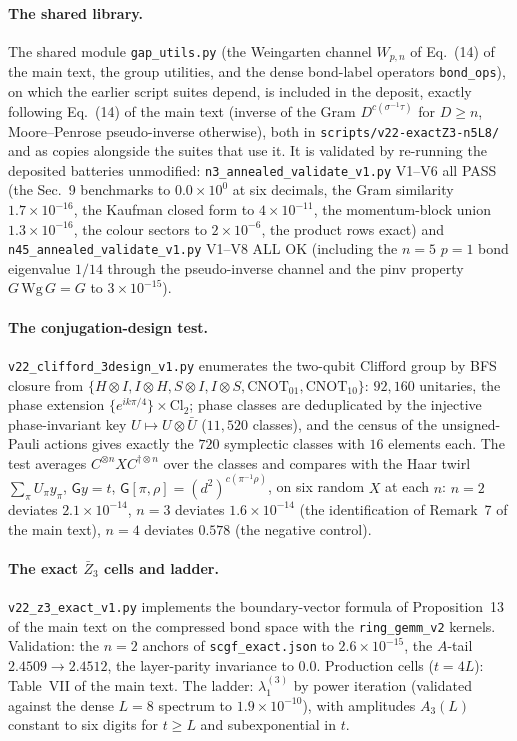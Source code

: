 \documentclass[aps,prx,reprint,superscriptaddress,nobibnotes,longbibliography]{revtex4-2}
\begin{document}
\paragraph{The shared library.}
The shared module \texttt{gap\_utils.py} (the Weingarten channel
$W_{p,n}$ of Eq.~(14) of the main text, the group utilities, and the dense bond-label
operators \texttt{bond\_ops}), on which the earlier script suites depend,
is included in the deposit, exactly following Eq.~(14) of the main text (inverse of the
Gram $D^{c(\sigma^{-1}\tau)}$ for $D\ge n$, Moore--Penrose pseudo-inverse
otherwise), both in \texttt{scripts/v22-exactZ3-n5L8/} and as copies
alongside the suites that use it.  It is validated by re-running the
deposited batteries unmodified: \texttt{n3\_annealed\_validate\_v1.py} V1--V6 all
PASS (the Sec.~9 benchmarks to $0.0\times10^{0}$ at six decimals, the
Gram similarity $1.7\times10^{-16}$, the Kaufman closed form to
$4\times10^{-11}$, the momentum-block union $1.3\times10^{-16}$, the
colour sectors to $2\times10^{-6}$, the product rows exact) and
\texttt{n45\_annealed\_validate\_v1.py} V1--V8 ALL OK (including the
$n=5$ $p=1$ bond eigenvalue $1/14$ through the pseudo-inverse channel and
the pinv property $G\,\mathrm{Wg}\,G=G$ to $3\times10^{-15}$).

\paragraph{The conjugation-design test.}
\texttt{v22\_clifford\_3design\_v1.py} enumerates the two-qubit Clifford
group by BFS closure from $\{H\otimes I, I\otimes H, S\otimes I,
I\otimes S, \mathrm{CNOT}_{01}, \mathrm{CNOT}_{10}\}$: $92{,}160$
unitaries, the phase extension $\{e^{ik\pi/4}\}\times\mathrm{Cl}_2$;
phase classes are deduplicated by the injective phase-invariant key
$U\mapsto U\otimes\bar U$ ($11{,}520$ classes), and the census of the
unsigned-Pauli actions gives exactly the $720$ symplectic classes with
$16$ elements each.  The test averages $C^{\otimes n}XC^{\dagger\otimes
n}$ over the classes and compares with the Haar twirl
$\sum_\pi U_\pi y_\pi$, $\mathsf Gy=t$,
$\mathsf G[\pi,\rho]=(d^2)^{c(\pi^{-1}\rho)}$, on six random $X$ at each
$n$: $n=2$ deviates $2.1\times10^{-14}$, $n=3$ deviates
$1.6\times10^{-14}$ (the identification of Remark~7 of the main text),
$n=4$ deviates $0.578$ (the negative control).

\paragraph{The exact $\bar Z_3$ cells and ladder.}
\texttt{v22\_z3\_exact\_v1.py} implements the boundary-vector formula of
Proposition~13 of the main text on the compressed bond space with the
\texttt{ring\_gemm\_v2} kernels.  Validation: the $n=2$ anchors of
\texttt{scgf\_exact.json} to $2.6\times10^{-15}$, the $A$-tail
$2.4509\to2.4512$, the layer-parity invariance to $0.0$.  Production
cells ($t=4L$): Table~VII of the main text.  The ladder:
$\lambda_1^{(3)}$ by power iteration (validated against the dense $L=8$
spectrum to $1.9\times10^{-10}$), with amplitudes $A_3(L)$ constant to
six digits for $t\ge L$ and subexponential in $t$.
\end{document}
